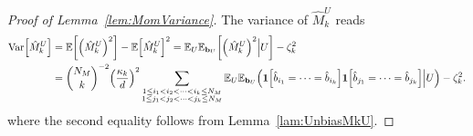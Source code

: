 \documentclass[aps,prl,twocolumn,nofootinbib,superscriptaddress,10pt]{revtex4-2}
\let\originalleft\left
\let\originalright\right
\renewcommand{\left}{\mathopen{}\mathclose\bgroup\originalleft}
\renewcommand{\right}{\aftergroup\egroup\originalright}
\def\E{ {\mathbb E} } %
\DeclareMathOperator{\Var}{Var}
\theoremstyle{plain}
\theoremstyle{definition}
\newcommand{\lref}[1]{Lemma~\ref{#1}}
\begin{document}
\begin{proof}[Proof of \lref{lem:MomVariance}]
The variance of $\hat{M}_k^{U}$ reads
\begin{align}\label{eq:VarhatM} 
	\Var\left[ \hat{M}_k^{U}\right] 
	&= \E\left[ \left( \hat{M}_k^{U}\right) ^2 \right] - \E\left[ \hat{M}_k^{U} \right]^2 
	= \E_{U} \E_{\mathbf{b}_{U}} \left[ \left( \hat{M}_k^{U}\right) ^2 \Big| U \right]
	- \zeta_k^2
	\nonumber\\
	&= \binom{N_M}{k}^{-2} \left( \frac{\kappa_k}{d}\right)^2
	\sum_{\substack{1\leq i_1<i_2<\dots<i_k\leq N_M \\ 1\leq j_1<j_2<\dots<j_k\leq N_M}} 
	\E_{U} \E_{\mathbf{b}_{U}} \Big(
	\textbf{1}\left[\hat{b}_{i_1}=\dots=\hat{b}_{i_k}\right]  
	\textbf{1}\left[\hat{b}_{j_1}=\dots=\hat{b}_{j_k}\right]  \Big| U \Big) - \zeta_k^2. 
\end{align}
where the second equality follows from \lref{lam:UnbiasMkU}. 


\end{proof}
\end{document}

